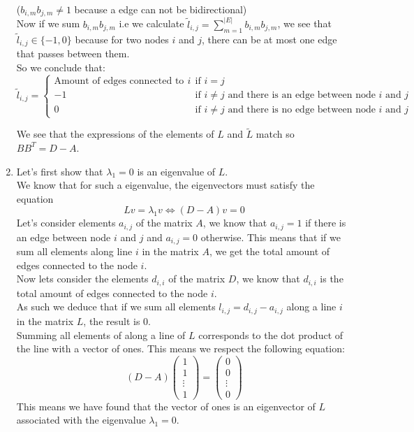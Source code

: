 \documentclass[11pt, legalpaper]{article}
\begin{document}
\begin{enumerate}
\begin{itemize}
    \end{itemize} 
    ($b_{i,m}b_{j,m} \ne 1$ because a edge can not be bidirectional) \\
    Now if we sum $b_{i,m}b_{j,m}$ i.e we calculate $\tilde{l}_{i,j}=\sum_{m=1}^{|E|}b_{i,m}b_{j,m}$, we see that $\tilde{l}_{i,j} \in \{-1, 0\}$ because for two nodes $i$ and $j$, there can be at most one edge that passes between them. \\
    So we conclude that:
    $$\tilde{l}_{i,j}=\begin{cases}
        \text{Amount of edges connected to node $i$} & \text{if } i=j\\
        -1 & \text{if } i \ne j \text{ and there is an edge between node $i$ and $j$}\\
        0 & \text{if } i \ne j \text{ and there is no edge between node $i$ and $j$}
    \end{cases}$$

    We see that the expressions of the elements of $L$ and $\tilde{L}$ match so $BB^T=D-A$.
    \item Let's first show that $\lambda_1=0$ is an eigenvalue of $L$. \\
            We know that for such a eigenvalue, the eigenvectors must satisfy the equation
            $$Lv=\lambda_1 v \Longleftrightarrow (D-A)v=0$$ 
            Let's consider elements $a_{i,j}$ of the matrix $A$, we know that $a_{i,j}=1$ if there is an edge between node $i$ and $j$ and $a_{i,j}=0$ otherwise. 
            This means that if we sum all elements along line $i$ in the matrix $A$, we get the total amount of edges connected to the node $i$. \\
            Now lets consider the elements $d_{i,i}$ of the matrix $D$, we know that $d_{i,i}$ is the total amount of edges connected to the node $i$. \\
            As such we deduce that if we sum all elements $l_{i,j}=d_{i,j}-a_{i,j}$ along a line $i$ in the matrix $L$, the result is 0. \\
            Summing all elements of along a line of $L$ corresponds to the dot product of the line with a vector of ones. This means we respect the following equation:
            $$(D-A)\begin{pmatrix} 1 \\ 1 \\ \vdots \\ 1 \end{pmatrix}=\begin{pmatrix} 0 \\ 0 \\ \vdots \\ 0 \end{pmatrix}$$
            This means we have found that the vector of ones is an eigenvector of $L$ associated with the eigenvalue $\lambda_1=0$.\\


\end{enumerate}
\end{document}
